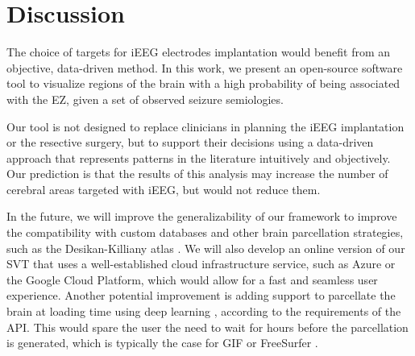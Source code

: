 \section{Discussion}
\label{sec:svt_discussion}

The choice of targets for \ac{iEEG} electrodes implantation would benefit from an objective, data-driven method.
In this work, we present an open-source software tool to visualize regions of the brain with a high probability of being associated with the \ac{EZ}, given a set of observed seizure semiologies.

Our tool is not designed to replace clinicians in planning the \ac{iEEG} implantation or the resective surgery, but to support their decisions using a data-driven approach that represents patterns in the literature intuitively and objectively.
Our prediction is that the results of this analysis may increase the number of cerebral areas targeted with \ac{iEEG}, but would not reduce them.  %

In the future, we will improve the generalizability of our framework to improve the compatibility with custom databases and other brain parcellation strategies, such as the Desikan-Killiany atlas \cite{desikan_automated_2006}.
We will also develop an online version of our \ac{SVT} that uses a well-established cloud infrastructure service, such as Azure or the Google Cloud Platform, which would allow for a fast and seamless user experience.
Another potential improvement is adding support to parcellate the brain at loading time using deep learning \cite{li_compactness_2017,perez-garcia_fepegarhighresnet_2019}, according to the requirements of the \ac{API}.
This would spare the user the need to wait for hours before the parcellation is generated, which is typically the case for \ac{GIF} \cite{cardoso_geodesic_2015} or FreeSurfer%
.





